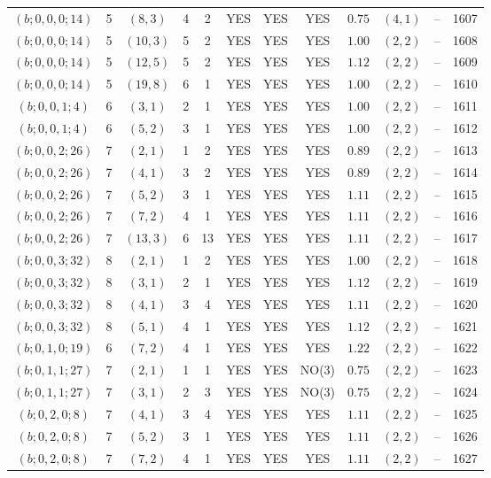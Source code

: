 \begin{longtable}{|c|c|c|c|c|c|c|c|c|c|c|c|}
$(b;0,0,0;14)$ & 5 & $(8,3)$ & 4 & 2 & YES & YES & YES & $0.75$ & $(4,1)$ & -- & 1607\\
$(b;0,0,0;14)$ & 5 & $(10,3)$ & 5 & 2 & YES & YES & YES & $1.00$ & $(2,2)$ & -- & 1608\\
$(b;0,0,0;14)$ & 5 & $(12,5)$ & 5 & 2 & YES & YES & YES & $1.12$ & $(2,2)$ & -- & 1609\\
$(b;0,0,0;14)$ & 5 & $(19,8)$ & 6 & 1 & YES & YES & YES & $1.00$ & $(2,2)$ & -- & 1610\\
$(b;0,0,1;4)$ & 6 & $(3,1)$ & 2 & 1 & YES & YES & YES & $1.00$ & $(2,2)$ & -- & 1611\\
$(b;0,0,1;4)$ & 6 & $(5,2)$ & 3 & 1 & YES & YES & YES & $1.00$ & $(2,2)$ & -- & 1612\\
$(b;0,0,2;26)$ & 7 & $(2,1)$ & 1 & 2 & YES & YES & YES & $0.89$ & $(2,2)$ & -- & 1613\\
$(b;0,0,2;26)$ & 7 & $(4,1)$ & 3 & 2 & YES & YES & YES & $0.89$ & $(2,2)$ & -- & 1614\\
$(b;0,0,2;26)$ & 7 & $(5,2)$ & 3 & 1 & YES & YES & YES & $1.11$ & $(2,2)$ & -- & 1615\\
$(b;0,0,2;26)$ & 7 & $(7,2)$ & 4 & 1 & YES & YES & YES & $1.11$ & $(2,2)$ & -- & 1616\\
$(b;0,0,2;26)$ & 7 & $(13,3)$ & 6 & 13 & YES & YES & YES & $1.11$ & $(2,2)$ & -- & 1617\\
$(b;0,0,3;32)$ & 8 & $(2,1)$ & 1 & 2 & YES & YES & YES & $1.00$ & $(2,2)$ & -- & 1618\\
$(b;0,0,3;32)$ & 8 & $(3,1)$ & 2 & 1 & YES & YES & YES & $1.12$ & $(2,2)$ & -- & 1619\\
$(b;0,0,3;32)$ & 8 & $(4,1)$ & 3 & 4 & YES & YES & YES & $1.11$ & $(2,2)$ & -- & 1620\\
$(b;0,0,3;32)$ & 8 & $(5,1)$ & 4 & 1 & YES & YES & YES & $1.12$ & $(2,2)$ & -- & 1621\\
$(b;0,1,0;19)$ & 6 & $(7,2)$ & 4 & 1 & YES & YES & YES & $1.22$ & $(2,2)$ & -- & 1622\\
$(b;0,1,1;27)$ & 7 & $(2,1)$ & 1 & 1 & YES & YES & NO(3) & $0.75$ & $(2,2)$ & -- & 1623\\
$(b;0,1,1;27)$ & 7 & $(3,1)$ & 2 & 3 & YES & YES & NO(3) & $0.75$ & $(2,2)$ & -- & 1624\\
$(b;0,2,0;8)$ & 7 & $(4,1)$ & 3 & 4 & YES & YES & YES & $1.11$ & $(2,2)$ & -- & 1625\\
$(b;0,2,0;8)$ & 7 & $(5,2)$ & 3 & 1 & YES & YES & YES & $1.11$ & $(2,2)$ & -- & 1626\\
$(b;0,2,0;8)$ & 7 & $(7,2)$ & 4 & 1 & YES & YES & YES & $1.11$ & $(2,2)$ & -- & 1627\\

\end{longtable}

